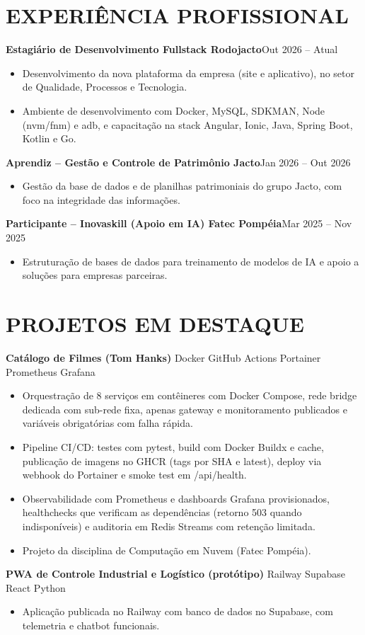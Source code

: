 \documentclass[9pt,a4paper]{extarticle}
\newcommand{\entry}[2]{\vspace{2pt}\noindent\textbf{#1}\hfill{\color{gray}#2}\par}
\newcommand{\projtitle}[2]{\vspace{2pt}\noindent\textbf{#1} {\color{gray}\textperiodcentered{} #2}\par}
\begin{document}
\section*{EXPERIÊNCIA PROFISSIONAL}
\entry{Estagiário de Desenvolvimento Fullstack \textperiodcentered{} Rodojacto}{Out 2026 – Atual}
\begin{itemize}
  \item Desenvolvimento da nova plataforma da empresa (site e aplicativo), no setor de Qualidade, Processos e Tecnologia.
  \item Ambiente de desenvolvimento com Docker, MySQL, SDKMAN, Node (nvm/fnm) e adb, e capacitação na stack Angular, Ionic, Java, Spring Boot, Kotlin e Go.
\end{itemize}
\entry{Aprendiz – Gestão e Controle de Patrimônio \textperiodcentered{} Jacto}{Jan 2026 – Out 2026}
\begin{itemize}
  \item Gestão da base de dados e de planilhas patrimoniais do grupo Jacto, com foco na integridade das informações.
\end{itemize}
\entry{Participante – Inovaskill (Apoio em IA) \textperiodcentered{} Fatec Pompéia}{Mar 2025 – Nov 2025}
\begin{itemize}
  \item Estruturação de bases de dados para treinamento de modelos de IA e apoio a soluções para empresas parceiras.
\end{itemize}

\section*{PROJETOS EM DESTAQUE}
\projtitle{Catálogo de Filmes (Tom Hanks)}{Docker \textperiodcentered{} GitHub Actions \textperiodcentered{} Portainer \textperiodcentered{} Prometheus \textperiodcentered{} Grafana}
\begin{itemize}
  \item Orquestração de 8 serviços em contêineres com Docker Compose, rede bridge dedicada com sub-rede fixa, apenas gateway e monitoramento publicados e variáveis obrigatórias com falha rápida.
  \item Pipeline CI/CD: testes com pytest, build com Docker Buildx e cache, publicação de imagens no GHCR (tags por SHA e latest), deploy via webhook do Portainer e smoke test em /api/health.
  \item Observabilidade com Prometheus e dashboards Grafana provisionados, healthchecks que verificam as dependências (retorno 503 quando indisponíveis) e auditoria em Redis Streams com retenção limitada.
  \item Projeto da disciplina de Computação em Nuvem (Fatec Pompéia).
\end{itemize}
\projtitle{PWA de Controle Industrial e Logístico (protótipo)}{Railway \textperiodcentered{} Supabase \textperiodcentered{} React \textperiodcentered{} Python}
\begin{itemize}
  \item Aplicação publicada no Railway com banco de dados no Supabase, com telemetria e chatbot funcionais.
\end{itemize}
\end{document}
